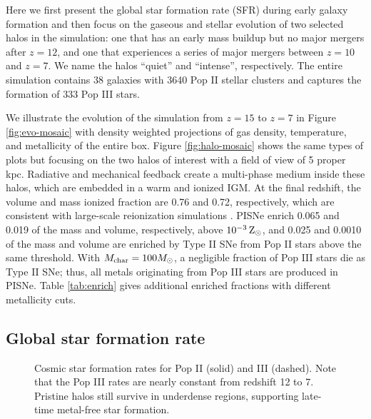 \documentclass[apj]{emulateapj}
\begin{document}



Here we first present the global star formation rate (SFR) during
early galaxy formation and then focus on the gaseous and stellar
evolution of two selected halos in the simulation: one that has an
early mass buildup but no major mergers after $z=12$, and one that
experiences a series of major mergers between $z=10$ and $z=7$.  We
name the halos ``quiet'' and ``intense'', respectively.  The entire
simulation contains 38 galaxies with 3640 Pop II stellar clusters and
captures the formation of 333 Pop III stars.

We illustrate the evolution of the simulation from $z=15$ to $z=7$ in
Figure \ref{fig:evo-mosaic} with density weighted projections of gas
density, temperature, and metallicity of the entire box.  Figure
\ref{fig:halo-mosaic} shows the same types of plots but focusing on
the two halos of interest with a field of view of 5 proper kpc.
Radiative and mechanical feedback create a multi-phase medium inside
these halos, which are embedded in a warm and ionized IGM.  At the
final redshift, the volume and mass ionized fraction are 0.76 and
0.72, respectively, which are consistent with large-scale reionization
simulations \citep{Zahn11}.  PISNe enrich 0.065 and 0.019 of the mass
and volume, respectively, above $10^{-3} {\rm\,Z_\odot}$, and 0.025 and 0.0010
of the mass and volume are enriched by Type II SNe from Pop II stars
above the same threshold.  With $M_{\rm char} = 100 \Ms$, a negligible
fraction of Pop III stars die as Type II SNe; thus, all metals
originating from Pop III stars are produced in PISNe.  Table
\ref{tab:enrich} gives additional enriched fractions with different
metallicity cuts.

\subsection{Global star formation rate}


\begin{figure}
\caption{\label{fig:sfr} Cosmic star formation rates for Pop II
  (solid) and III (dashed).  Note that the Pop III rates are nearly
  constant from redshift 12 to 7.  Pristine halos still survive in
  underdense regions, supporting late-time metal-free star formation.}
\end{figure}
\end{document}
